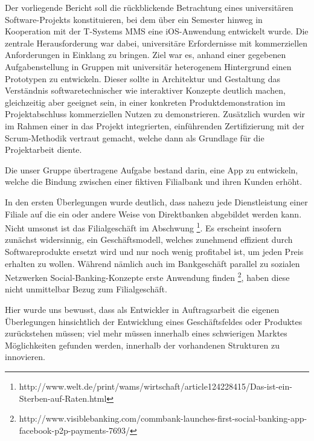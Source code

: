 
Der vorliegende Bericht soll die rückblickende Betrachtung eines universitären Software-Projekts konstituieren, bei dem über ein Semester hinweg in Kooperation mit der T-Systems MMS eine iOS-Anwendung entwickelt wurde. Die zentrale Herausforderung war dabei, universitäre Erfordernisse mit kommerziellen Anforderungen in Einklang zu bringen. Ziel war es, anhand einer gegebenen Aufgabenstellung in Gruppen mit universitär heterogenem Hintergrund einen Prototypen zu entwickeln.
Dieser sollte in Architektur und Gestaltung das Verständnis softwaretechnischer wie interaktiver Konzepte deutlich machen, gleichzeitig aber geeignet sein, in einer konkreten Produktdemonstration im Projektabschluss kommerziellen Nutzen zu demonstrieren.
Zusätzlich wurden wir im Rahmen einer in das Projekt integrierten, einführenden Zertifizierung mit der Scrum-Methodik vertraut gemacht, welche dann als Grundlage für die Projektarbeit diente. 

	Die unser Gruppe übertragene Aufgabe bestand darin, eine App zu entwickeln, welche die Bindung zwischen einer fiktiven Filialbank und ihren Kunden erhöht.
	
	 In den ersten Überlegungen wurde deutlich, dass nahezu jede Dienstleistung einer Filiale auf die ein oder andere Weise von Direktbanken abgebildet werden kann. Nicht umsonst ist das Filialgeschäft im Abschwung \footnote{http://www.welt.de/print/wams/wirtschaft/article124228415/Das-ist-ein-Sterben-auf-Raten.html}. Es erscheint insofern zunächst widersinnig, ein Geschäftsmodell, welches zunehmend effizient durch Softwareprodukte ersetzt wird und nur noch wenig profitabel ist, um jeden Preis erhalten zu wollen. Während nämlich auch im Bankgeschäft parallel zu sozialen Netzwerken Social-Banking-Konzepte erste Anwendung finden \footnote{http://www.visiblebanking.com/commbank-launches-first-social-banking-app-facebook-p2p-payments-7693/}, haben diese nicht unmittelbar Bezug zum Filialgeschäft.
	 
	 Hier wurde uns bewusst, dass als Entwickler in Auftragsarbeit die eigenen Überlegungen hinsichtlich der Entwicklung eines Geschäftsfeldes oder Produktes zurückstehen müssen; viel mehr müssen innerhalb eines schwierigen Marktes Möglichkeiten gefunden werden, innerhalb der vorhandenen Strukturen zu innovieren.
	 